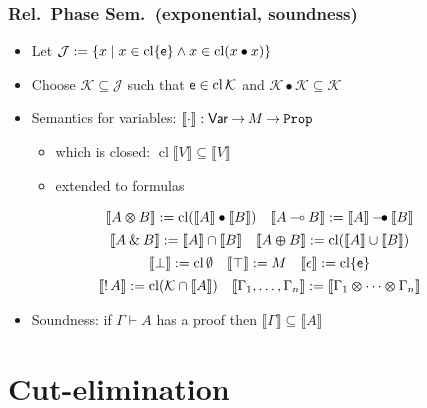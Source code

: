 \documentclass[xcolor=pdftex,graphicx=pdftex,12pt]{beamer}
\newcommand{\coq}[1]{\ensuremath{\mathalpha{\mathtt{#1}}}}
\newcommand{\sem}[1]{\llbracket{#1}\rrbracket}
\newcommand{\cfun}{\mathbin{\rightarrow}}
\newcommand{\Prop}{\coq{Prop}}
\newcommand{\cdef}{\mathrel{\mathtt{:=}}}
\newcommand{\seq}{\mathrel\vdash}
\newcommand{\lwith}{\mathbin{\text{\upshape \&}}}
\newcommand{\lplus}{\mathbin{\varoplus}}
\newcommand{\ltime}{\mathbin{\varotimes}}
\newcommand{\lunit}{\mathalpha{\epsilon}}
\newcommand{\limp}{\mathbin{\multimap}}
\newcommand{\ltop}{\mathalpha{\top}}
\newcommand{\lbot}{\mathalpha{\bot}}
\newcommand{\lbang}{\mathop{!}}
\newcommand{\cl}{\mathop{\mathrm{cl}}}
\newcommand{\mmult}{\mathbin{\bullet}}
\newcommand{\mimp}{\mathbin{\multimap\mskip -14mu\bullet}}
\newcommand{\munit}{\mathalpha{\mathsf e}}
\newcommand{\set}[1]{\mathcal{#1}}
\begin{document}
\begin{frame}

\frametitle{Rel.\ Phase Sem.\ (exponential, soundness)}

\begin{itemize}
\item Let $\set J \cdef \{x \mid x\in\cl\{\munit\} \wedge x\in\cl(x\mmult x)\}$
\item Choose $\set K\subseteq \set J$ such that $\munit\in\cl\set K$ and $\set K\mmult\set K\subseteq\set K$ 
\item Semantics for variables: $\sem\cdot:\mathsf{Var}\cfun M\cfun\Prop$
  \begin{itemize}
  \item which is closed: $\cl\sem{V}\subseteq \sem V$
  \item extended to formulas
  \end{itemize} 
\end{itemize}

\vspace{-0.5cm}

$$
\begin{array}{c}
\sem{A\ltime B}\cdef\cl(\sem A\mmult\sem B)\quad \sem{A\limp B}\cdef \sem A\mimp\sem B\\[1ex]
\sem{A\lwith B}\cdef \sem A\cap\sem B \quad \sem{A\lplus B}\cdef \cl(\sem A\cup\sem B)\\[1ex]
\sem{\lbot}\cdef \cl\emptyset\quad \sem\ltop\cdef M\quad \sem\lunit\cdef\cl\{\munit\}\\[1ex]
\sem{\lbang A} \cdef \cl(\set K\cap\sem A)\quad \sem{\Gamma_1,\ldots,\Gamma_n}\cdef\sem{\Gamma_1\ltime\cdots\ltime\Gamma_n}
\end{array}
$$

\begin{itemize}
\item Soundness: if $\Gamma\seq A$ has a proof then $\sem\Gamma\subseteq\sem A$
\end{itemize}

\end{frame}

\section{Cut-elimination}

\newcommand{\ulist}[1]{\lfloor#1\rfloor}
\end{document}
